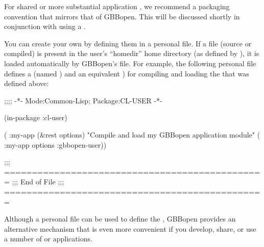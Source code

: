 \documentclass[10pt,twoside,english,pdftex]{article}
\begin{document}
For shared or more substantial application , we recommend a
packaging convention that mirrors that of GBBopen.  This will be discussed
shortly in conjunction with using a .

%
%
%
%
%
%
You can create your own  by defining them in a personal
 file.  If a 
file (source or compiled) is present in the user's ``homedir'' home directory
(as defined by ), it is loaded
automatically by GBBopen's  file.  For example, the
following personal  file defines a
 (named ) and an equivalent
 ) for compiling and loading the
  that was defined above:
%
\W\supp\notpretop
\begin{example}
  ;;;; -*- Mode:Common-Lisp; Package:CL-USER -*-

  (in-package :cl-user)

  ( :my-app (&rest options)
    "Compile and load my GBBopen application module"
    ( :my-app options :gbbopen-user))

  ;;; ===============================================
  ;;;   End of File
  ;;; ===============================================
\end{example}

\label{sec:personal-gbbopen-modules-directory}

%
%
%
%
%
%
Although a personal  file can be used to define
the  , GBBopen provides an alternative
mechanism that is even more convenient if you develop, share, or use a number
of  or applications.
\end{document}
